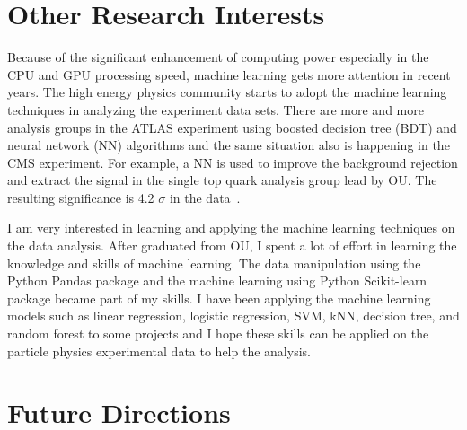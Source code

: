 \documentclass[12pt]{article}
\begin{document}
\section{Other Research Interests}
Because of the significant enhancement of computing power especially in the CPU and GPU processing speed, machine learning gets more attention in recent years. 
The high energy physics community starts to adopt the machine learning techniques in analyzing the experiment data sets.
There are more and more analysis groups in the ATLAS experiment using boosted decision tree (BDT) and neural network (NN) algorithms and the same situation also is happening in the CMS experiment.
For example, a NN is used to improve the background rejection and extract the signal in the single top quark analysis group lead by OU. The resulting significance is 4.2 $\sigma$ in the data~\cite{Aaboud:2017ylb}.

I am very interested in learning and applying the machine learning techniques on the  data analysis.
After graduated from OU, I spent a lot of effort in learning the knowledge and skills of  machine learning.
The data manipulation using the Python Pandas package and the machine learning using Python Scikit-learn package became part of my skills.
I have been applying the machine learning models such as linear regression, logistic regression, SVM, kNN, decision tree, and random forest to some projects and I hope these skills can be applied on the particle physics experimental data to help the analysis.


\section{Future Directions}
%
\end{document}
